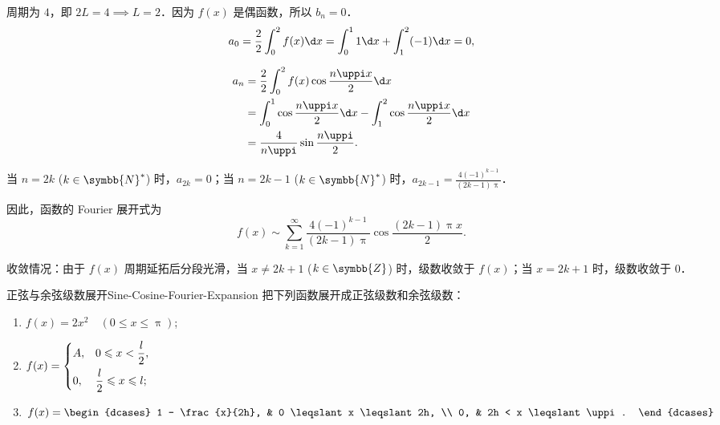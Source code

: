 \begin{solution}
    周期为 $4$，即 $2L = 4 \implies L = 2$．因为 $f(x)$ 是偶函数，所以 $b_n = 0$．
    \begin{equation}
        a_0 = \frac{2}{2} \int_{0}^{2} f(x) \d x = \int_{0}^{1} 1 \d x + \int_{1}^{2} (-1) \d x = 0,
    \end{equation}

    \begin{equation}
        \begin{aligned}
            a_n & = \frac{2}{2} \int_{0}^{2} f(x) \cos \frac{n\uppi x}{2} \d x                            \\
                & = \int_{0}^{1} \cos \frac{n\uppi x}{2} \d x - \int_{1}^{2} \cos \frac{n\uppi x}{2} \d x \\
                & = \frac{4}{n\uppi} \sin \frac{n\uppi}{2}.
        \end{aligned}
    \end{equation}

    当 $n = 2k$ ($k \in \symbb{N}^*$) 时，$a_{2k} = 0$；当 $n = 2k-1$ ($k \in \symbb{N}^*$) 时，$a_{2k-1} = \frac{4(-1)^{k-1}}{(2k-1)\uppi}$．

    因此，函数的 Fourier 展开式为
    \begin{equation}
        \boxed{f(x) \sim \sum_{k=1}^{\infty} \frac{4(-1)^{k-1}}{(2k-1)\uppi} \cos \frac{(2k-1)\uppi x}{2}}.
    \end{equation}

    收敛情况：由于 $f(x)$ 周期延拓后分段光滑，当 $x \neq 2k+1$ ($k \in \symbb{Z}$) 时，级数收敛于 $f(x)$；当 $x = 2k+1$ 时，级数收敛于 $0$．
\end{solution}

\begin{problem}{正弦与余弦级数展开}{Sine-Cosine-Fourier-Expansion}
    把下列函数展开成正弦级数和余弦级数：
    \begin{enumerate}
        \item $f(x) = 2x^2 \quad (0 \leqslant x \leqslant \uppi)$;
        \item $f(x) = \begin{dcases} A, & 0 \leqslant x < \frac{l}{2}, \\ 0, & \frac{l}{2} \leqslant x \leqslant l; \end{dcases}$
        \item $f(x) = \begin{dcases} 1 - \frac{x}{2h}, & 0 \leqslant x \leqslant 2h, \\ 0, & 2h < x \leqslant \uppi. \end{dcases}$
    \end{enumerate}
\end{problem}

